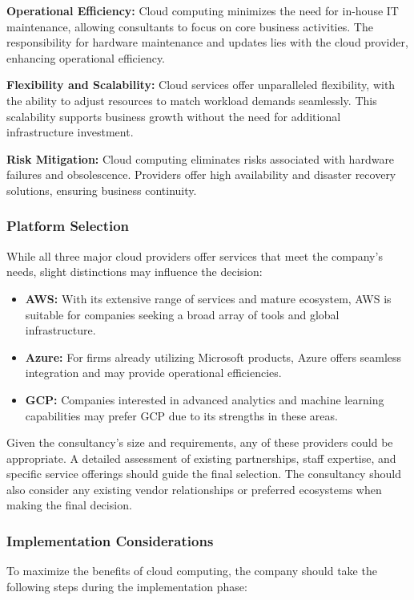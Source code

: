\documentclass{article}
\begin{document}
\textbf{Operational Efficiency:} Cloud computing minimizes the need for in-house IT maintenance, allowing consultants to focus on core business activities. The responsibility for hardware maintenance and updates lies with the cloud provider, enhancing operational efficiency.

\textbf{Flexibility and Scalability:} Cloud services offer unparalleled flexibility, with the ability to adjust resources to match workload demands seamlessly. This scalability supports business growth without the need for additional infrastructure investment.

\textbf{Risk Mitigation:} Cloud computing eliminates risks associated with hardware failures and obsolescence. Providers offer high availability and disaster recovery solutions, ensuring business continuity.

\subsubsection{Platform Selection}
While all three major cloud providers offer services that meet the company's needs, slight distinctions may influence the decision:
\begin{itemize}
    \item \textbf{AWS:} With its extensive range of services and mature ecosystem, AWS is suitable for companies seeking a broad array of tools and global infrastructure.
    \item \textbf{Azure:} For firms already utilizing Microsoft products, Azure offers seamless integration and may provide operational efficiencies.
    \item \textbf{GCP:} Companies interested in advanced analytics and machine learning capabilities may prefer GCP due to its strengths in these areas.
\end{itemize}
Given the consultancy's size and requirements, any of these providers could be appropriate. A detailed assessment of existing partnerships, staff expertise, and specific service offerings should guide the final selection. The consultancy should also consider any existing vendor relationships or preferred ecosystems when making the final decision.

\subsubsection{Implementation Considerations}
To maximize the benefits of cloud computing, the company should take the following steps during the implementation phase:
\end{document}
